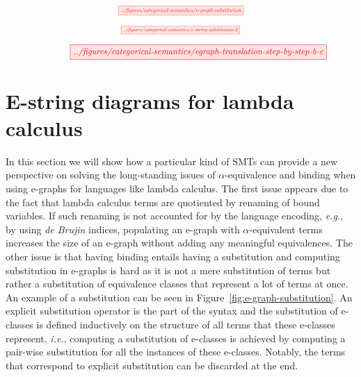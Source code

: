 \documentclass[sigconf, 9pt, nonacm]{acmart}
\begin{document}
\begin{figure*}
    \[
        \scalebox{0.55}{
        \tikzfig{../figures/categorical-semantics/e-graph-substitution}
        }
    \]
    \caption{E-graph explicit substitution example.}
    \label{fig:e-graph-substitution}
\end{figure*}

\begin{figure*}
    \[
        \scalebox{0.5}{
        \tikzfig{../figures/categorical-semantics/e-string-substitution-2}
        }
    \]
    \caption{E-string diagrammatic substitution example.}
    \label{fig:e-string-substitution}
\end{figure*}

\begin{figure*}[t!]
    \vspace{-3cm}
    \centering
    \[
        \hspace{1.3cm}
        \resizebox{0.8\textwidth}{!}{
        \tikzfig{../figures/categorical-semantics/egraph-translation-step-by-step-b-c}
        }
    \]
    \caption{Example translation from $(b)$ to $(c)$.}
    \label{fig:e-graph-example-b-c}
\end{figure*}

\section{E-string diagrams for lambda calculus}
In this section we will show how a particular kind of SMTs can provide a new perspective on solving the long-standing issues of $\alpha$-equivalence and binding when using e-graphs for languages like lambda calculus.
The first issue appears due to the fact that lambda calculus terms are quotiented by renaming of bound variables.
If such renaming is not accounted for by the language encoding, \textit{e.g.,} by using \textit{de Brujin} indices, populating an e-graph with $\alpha$-equivalent terms increases the size of an e-graph without adding any meaningful equivalences.
The other issue is that having binding entails having a substitution and computing substitution in e-graphs is hard as it is not a mere substitution of terms but rather a substitution of equivalence classes that represent a lot of terms at once.
An example of a substitution can be seen in Figure~\ref{fig:e-graph-substitution}. An explicit substitution operator is the part of the syntax and the substitution of e-classes is defined inductively on the structure of all terms that these e-classes represent, \textit{i.e.}, computing a substitution of e-classes is achieved by computing a pair-wise substitution for all the instances of these e-classes.
Notably, the terms that correspond to explicit substitution can be discarded at the end.
\end{document}
